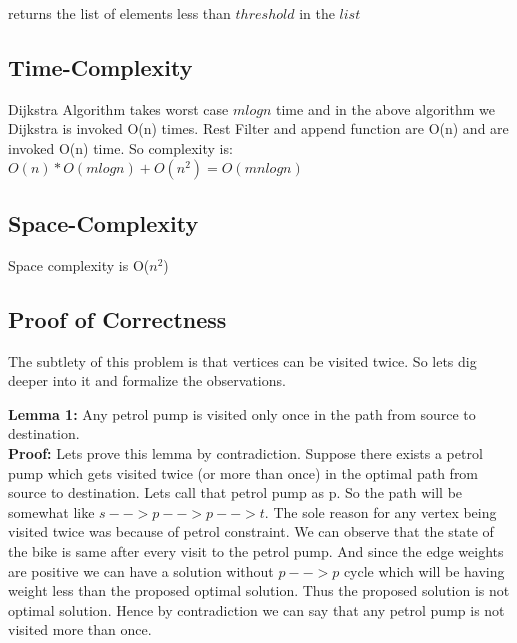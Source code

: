 \documentclass{article}
\begin{document}
\vspace*{0.2cm}
\begin{algorithmic}[1]
    \State returns the list of elements less than $threshold$ in the $list$
    \EndProcedure 
\end{algorithmic}

\subsection{Time-Complexity}
Dijkstra Algorithm takes worst case $mlogn$ time and in the above algorithm we Dijkstra is invoked O(n) times. 
Rest Filter and append function are O(n) and are invoked O(n) time. So complexity is: \\
\hspace*{1.5cm}$O(n)*O(mlogn) + O(n^2) = O(mnlogn)$

\subsection{Space-Complexity}
Space complexity is O($n^2$)

\subsection{Proof of Correctness}
The subtlety of this problem is that vertices can be visited twice. So lets dig deeper into it and formalize the observations.

\textbf{Lemma 1:} Any petrol pump is visited only once in the path from source to destination.\\
\textbf{Proof:} Lets prove this lemma by contradiction. Suppose there exists a petrol pump which gets visited twice (or more than once)
in the optimal path from source to destination. Lets call that petrol pump as p. So the path will be somewhat like $s-->p-->p-->t$.
The sole reason for any vertex being visited twice was because of petrol constraint.  
We can observe that the state of the bike is same after every visit to the petrol pump.
And since the edge weights are positive we can have a solution without $p-->p$ cycle which will be having weight less than the proposed optimal solution.
Thus the proposed solution is not optimal solution. Hence by contradiction we can say that any petrol pump is not visited more than once.\\
\end{document}
